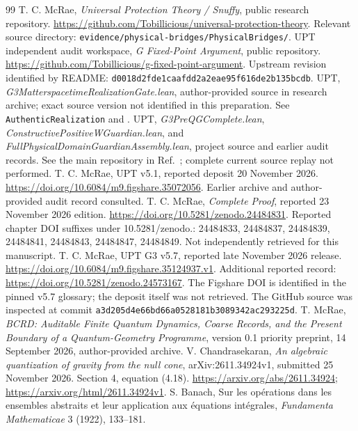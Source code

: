 \documentclass[11pt,a4paper]{article}
\begin{document}
\begin{thebibliography}{99}
 T. C. McRae, \emph{Universal Protection Theory / Snuffy}, public research repository. \url{https://github.com/Tobillicious/universal-protection-theory}. Relevant source directory: \texttt{evidence/physical-bridges/PhysicalBridges/}.
 UPT independent audit workspace, \emph{G Fixed-Point Argument}, public repository. \url{https://github.com/Tobillicious/g-fixed-point-argument}. Upstream revision identified by README: \texttt{d0018d2fde1caafdd2a2}\allowbreak\texttt{eae95f616de2b135bcdb}.
 UPT, \emph{G3MatterspacetimeRealizationGate.lean}, author-provided source in research archive; exact source version not identified in this preparation. See \texttt{AuthenticRealization} and .
 UPT, \emph{G3PreQGComplete.lean}, \emph{ConstructivePositiveWGuardian.lean}, and \emph{FullPhysicalDomainGuardianAssembly.lean}, project source and earlier audit records. See the main repository in Ref.~\cite{upt}; complete current source replay not performed.
 T. C. McRae, UPT v5.1, reported deposit 20 November 2026. \url{https://doi.org/10.6084/m9.figshare.35072056}. Earlier archive and author-provided audit record consulted.
 T. C. McRae, \emph{Complete Proof}, reported 23 November 2026 edition. \url{https://doi.org/10.5281/zenodo.24484831}. Reported chapter DOI suffixes under 10.5281/zenodo.: 24484833, 24484837, 24484839, 24484841, 24484843, 24484847, 24484849. Not independently retrieved for this manuscript.
 T. C. McRae, UPT G3 v5.7, reported late November 2026 release. \url{https://doi.org/10.6084/m9.figshare.35124937.v1}. Additional reported record: \url{https://doi.org/10.5281/zenodo.24573167}. The Figshare DOI is identified in the pinned v5.7 glossary; the deposit itself was not retrieved. The GitHub source was inspected at commit \texttt{a3d205d4e66bd66a05281}\allowbreak\texttt{81b3089342ac293225d}.
 T. McRae, \emph{BCRD: Auditable Finite Quantum Dynamics, Coarse Records, and the Present Boundary of a Quantum-Geometry Programme}, version 0.1 priority preprint, 14 September 2026, author-provided archive.
 V. Chandrasekaran, \emph{An algebraic quantization of gravity from the null cone}, arXiv:2611.34924v1, submitted 25 November 2026. Section 4, equation (4.18). \url{https://arxiv.org/abs/2611.34924}; \url{https://arxiv.org/html/2611.34924v1}.
 S. Banach, Sur les opérations dans les ensembles abstraits et leur application aux équations intégrales, \emph{Fundamenta Mathematicae} 3 (1922), 133--181.

\end{thebibliography}
\end{document}
